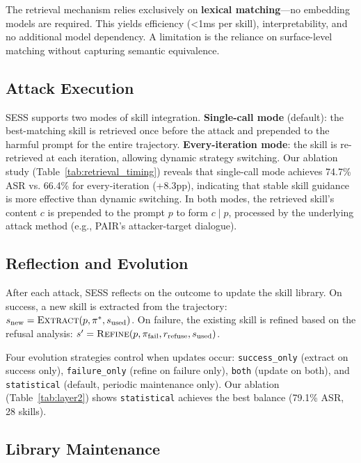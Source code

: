 \documentclass[letterpaper]{article}
\begin{document}
The retrieval mechanism relies exclusively on \textbf{lexical matching}---no embedding models are required. This yields efficiency (<1ms per skill), interpretability, and no additional model dependency. A limitation is the reliance on surface-level matching without capturing semantic equivalence.

\subsection{Attack Execution}

SESS supports two modes of skill integration. \textbf{Single-call mode} (default): the best-matching skill is retrieved once before the attack and prepended to the harmful prompt for the entire trajectory. \textbf{Every-iteration mode}: the skill is re-retrieved at each iteration, allowing dynamic strategy switching. Our ablation study (Table~\ref{tab:retrieval_timing}) reveals that single-call mode achieves 74.7\% ASR vs. 66.4\% for every-iteration (+8.3pp), indicating that stable skill guidance is more effective than dynamic switching. In both modes, the retrieved skill's content $c$ is prepended to the prompt $p$ to form $c \mathbin{|} p$, processed by the underlying attack method (e.g., PAIR's attacker-target dialogue).

\subsection{Reflection and Evolution}

After each attack, SESS reflects on the outcome to update the skill library. On success, a new skill is extracted from the trajectory: $s_{\text{new}} = \textsc{Extract}(p, \pi^*, s_{\text{used}})$. On failure, the existing skill is refined based on the refusal analysis: $s' = \textsc{Refine}(p, \pi_{\text{fail}}, r_{\text{refuse}}, s_{\text{used}})$.

Four evolution strategies control when updates occur: \texttt{success\_only} (extract on success only), \texttt{failure\_only} (refine on failure only), \texttt{both} (update on both), and \texttt{statistical} (default, periodic maintenance only). Our ablation (Table~\ref{tab:layer2}) shows \texttt{statistical} achieves the best balance (79.1\% ASR, 28 skills).

\subsection{Library Maintenance}
\end{document}
